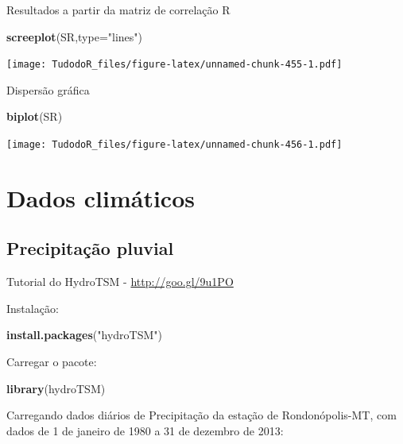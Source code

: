 \documentclass[
]{book}
\newenvironment{Shaded}{\begin{snugshade}}{\end{snugshade}}
\newcommand{\DataTypeTok}[1]{\textcolor[rgb]{0.13,0.29,0.53}{#1}}
\newcommand{\KeywordTok}[1]{\textcolor[rgb]{0.13,0.29,0.53}{\textbf{#1}}}
\newcommand{\NormalTok}[1]{#1}
\newcommand{\StringTok}[1]{\textcolor[rgb]{0.31,0.60,0.02}{#1}}
\begin{document}
Resultados a partir da matriz de correlação R

\begin{Shaded}
\begin{Highlighting}[]
\KeywordTok{screeplot}\NormalTok{(SR,}\DataTypeTok{type=}\StringTok{"lines"}\NormalTok{)}
\end{Highlighting}
\end{Shaded}

\texttt{[image: TudodoR\_files/figure-latex/unnamed-chunk-455-1.pdf]}

Dispersão gráfica

\begin{Shaded}
\begin{Highlighting}[]
\KeywordTok{biplot}\NormalTok{(SR)}
\end{Highlighting}
\end{Shaded}

\texttt{[image: TudodoR\_files/figure-latex/unnamed-chunk-456-1.pdf]}

\hypertarget{dados-climuxe1ticos-1}{%
\chapter{Dados climáticos}\label{dados-climuxe1ticos-1}}

\hypertarget{precipitauxe7uxe3o-pluvial}{%
\section{Precipitação pluvial}\label{precipitauxe7uxe3o-pluvial}}

Tutorial do HydroTSM - \url{http://goo.gl/9u1PO}

Instalação:

\begin{Shaded}
\begin{Highlighting}[]
\KeywordTok{install.packages}\NormalTok{(}\StringTok{"hydroTSM"}\NormalTok{)}
\end{Highlighting}
\end{Shaded}

Carregar o pacote:

\begin{Shaded}
\begin{Highlighting}[]
\KeywordTok{library}\NormalTok{(hydroTSM)}
\end{Highlighting}
\end{Shaded}

Carregando dados diários de Precipitação da estação de Rondonópolis-MT, com dados de 1 de janeiro de 1980 a 31 de dezembro de 2013:
\end{document}
